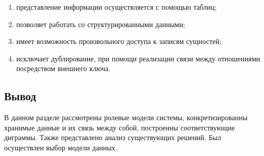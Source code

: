 \begin{enumerate}[label=\arabic*.]
	\item представление информации осуществляется с помощью таблиц;
	\item позволяет работать со структурированными данными;
	\item имеет возможность произвольного доступа к записям сущностей;
	\item исключает дублирование, при помощи реализации связи между отношениями посредством внешнего ключа.
\end{enumerate}

\subsection*{Вывод}

В данном разделе рассмотрены ролевые модели системы, конкретизированны хранимые данные и их
связь между собой, построенны соответствующие диграммы. Также представлено анализ существующих решений.
Был осуществлен выбор модели данных.